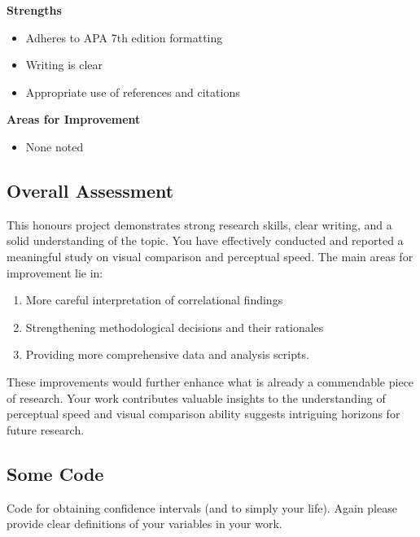 \documentclass[
  single column]{article}
\providecommand{\tightlist}{%
  \setlength{\itemsep}{0pt}\setlength{\parskip}{0pt}}\usepackage{longtable,booktabs,array}
\begin{document}
\textbf{Strengths}

\begin{itemize}
\tightlist
\item
  Adheres to APA 7th edition formatting
\item
  Writing is clear
\item
  Appropriate use of references and citations
\end{itemize}

\textbf{Areas for Improvement}

\begin{itemize}
\tightlist
\item
  None noted
\end{itemize}

\subsection{Overall Assessment}\label{overall-assessment}

This honours project demonstrates strong research skills, clear writing,
and a solid understanding of the topic. You have effectively conducted
and reported a meaningful study on visual comparison and perceptual
speed. The main areas for improvement lie in:

\begin{enumerate}
\def\labelenumi{\arabic{enumi}.}
\tightlist
\item
  More careful interpretation of correlational findings
\item
  Strengthening methodological decisions and their rationales
\item
  Providing more comprehensive data and analysis scripts.
\end{enumerate}

These improvements would further enhance what is already a commendable
piece of research. Your work contributes valuable insights to the
understanding of perceptual speed and visual comparison ability suggests
intriguing horizons for future research.

\newpage{}

\subsection{Some Code}\label{some-code}

Code for obtaining confidence intervals (and to simply your life). Again
please provide clear definitions of your variables in your work.
\end{document}
